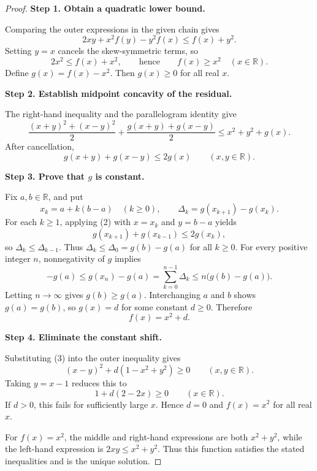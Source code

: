
\begin{dlsummary}[title={\bfseries Solution 32. The Skew-Symmetric Parallelogram Squeeze},breakable]

\begin{proof}
\textbf{Step 1. Obtain a quadratic lower bound.}

Comparing the outer expressions in the given chain gives
\[
2xy+x^2f(y)-y^2f(x)\leq f(x)+y^2.
\]
Setting $y=x$ cancels the skew-symmetric terms, so
\[
2x^2\leq f(x)+x^2,
\qquad\text{hence}\qquad
f(x)\geq x^2\quad(x\in\mathbb R). \tag{1}
\]
Define $g(x)=f(x)-x^2$. Then $g(x)\geq0$ for all real $x$.

\medskip
\noindent
\textbf{Step 2. Establish midpoint concavity of the residual.}

The right-hand inequality and the parallelogram identity give
\[
\frac{(x+y)^2+(x-y)^2}{2}
+\frac{g(x+y)+g(x-y)}2
\leq x^2+y^2+g(x).
\]
After cancellation,
\[
g(x+y)+g(x-y)\leq2g(x)
\qquad(x,y\in\mathbb R). \tag{2}
\]

\medskip
\noindent
\textbf{Step 3. Prove that $g$ is constant.}

Fix $a,b\in\mathbb R$, and put
\[
x_k=a+k(b-a)\quad(k\geq0),
\qquad
\Delta_k=g(x_{k+1})-g(x_k).
\]
For each $k\geq1$, applying (2) with $x=x_k$ and $y=b-a$ yields
\[
g(x_{k+1})+g(x_{k-1})\leq2g(x_k),
\]
so $\Delta_k\leq\Delta_{k-1}$. Thus $\Delta_k\leq\Delta_0=g(b)-g(a)$
for all $k\geq0$. For every positive integer $n$, nonnegativity of $g$
implies
\[
-g(a)\leq g(x_n)-g(a)
=\sum_{k=0}^{n-1}\Delta_k
\leq n\bigl(g(b)-g(a)\bigr).
\]
Letting $n\to\infty$ gives $g(b)\geq g(a)$. Interchanging $a$ and $b$
shows $g(a)=g(b)$, so $g(x)=d$ for some constant $d\geq0$. Therefore
\[
f(x)=x^2+d. \tag{3}
\]

\medskip
\noindent
\textbf{Step 4. Eliminate the constant shift.}

Substituting (3) into the outer inequality gives
\[
(x-y)^2+d(1-x^2+y^2)\geq0
\qquad(x,y\in\mathbb R).
\]
Taking $y=x-1$ reduces this to
\[
1+d(2-2x)\geq0\qquad(x\in\mathbb R).
\]
If $d>0$, this fails for sufficiently large $x$. Hence $d=0$ and
$f(x)=x^2$ for all real $x$.

For $f(x)=x^2$, the middle and right-hand expressions are both
$x^2+y^2$, while the left-hand expression is $2xy\leq x^2+y^2$.
Thus this function satisfies the stated inequalities and is the unique
solution.
\end{proof}

\end{dlsummary}